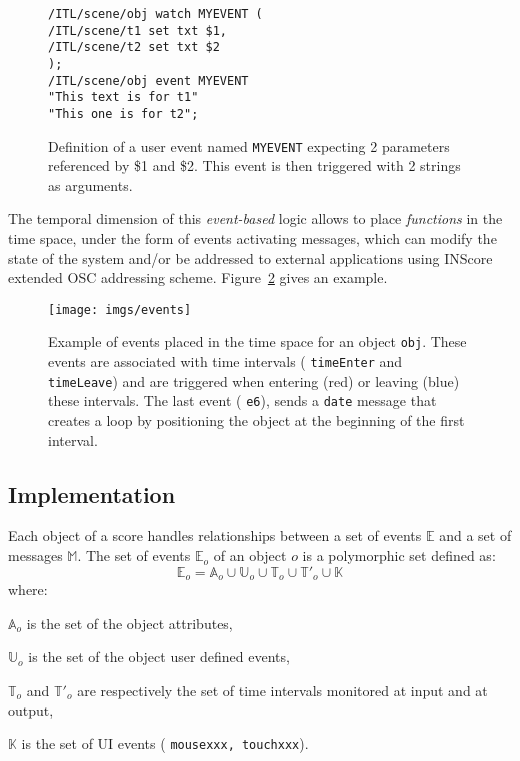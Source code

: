 \documentclass{article}
\newcommand{\OSC}[1]	{{\fontsize{8.5pt}{8pt} \selectfont\texttt{#1}}}
\newcommand{\tab}{\hspace*{4mm}}
\let\olditemize\itemize
\let\oldenditemize\enditemize
\renewenvironment{itemize} 	{\olditemize \renewcommand{\labelitemi}{$\bullet$} \setlength{\itemsep}{0mm}}{\oldenditemize}
\newcommand{\sample}[1]		{\vspace{-0.2em}\begin{center}\colorbox{mygrey}{\begin{minipage}[t]{0.98\columnwidth} {\small \texttt{#1}}\end{minipage}}\end{center}}
\begin{document}
\begin{figure}[h]
   \centering
   \sample{/ITL/scene/obj watch MYEVENT ( \\
\tab/ITL/scene/t1 set txt \$1, \\
\tab/ITL/scene/t2 set txt \$2 \\
);   \\   
/ITL/scene/obj event MYEVENT \\
\hspace*{25mm}"This text is for t1"\\
\hspace*{25mm}"This one is for t2"; 
}
   \caption{Definition of a user event named \OSC{MYEVENT} expecting 2 parameters referenced by \$1 and \$2. This event is then triggered with 2 strings as arguments.}
   \label{fig:uevent}
\end{figure}

The temporal dimension of this \emph{event-based} logic allows to place \emph{functions} in the time space, under the form of events 
activating messages, which can modify the state of the system and/or be addressed to external applications using INScore extended OSC addressing scheme. Figure~\ref{fig:events} gives an example. %
  
\begin{figure}[h]
   \centering
   \texttt{[image: imgs/events]}
   \caption{Example of events placed in the time space for an object \OSC{obj}. These events are associated with time intervals (\OSC{timeEnter} and \OSC{timeLeave}) and are triggered when entering (red) or leaving (blue) these intervals. The last event (\OSC{e6}), sends a \OSC{date} message that creates a loop by positioning the object at the beginning of the first interval.}
   \label{fig:events}
\end{figure}


\subsection{Implementation}

Each object of a score handles relationships between a set of events $\mathbb{E}$ and a set of messages $\mathbb{M}$. The set of events $\mathbb{E}_o$ of an object $o$ is a polymorphic set defined as:
\[
	\mathbb{E}_o = \mathbb{A}_o \cup \mathbb{U}_o \cup \mathbb{T}_o \cup \mathbb{T'}_o \cup \mathbb{K}  
\] 
where:
\begin{itemize}
\item[-] $\mathbb{A}_o$ is the set of the object attributes, 
\item[-] $\mathbb{U}_o$ is the set of the object user defined events, 
\item[-] $\mathbb{T}_o$ and $\mathbb{T'}_o$ are respectively the set of time intervals monitored at input and at output,
\item[-] $\mathbb{K}$ is the set of UI events (\OSC{mousexxx, touchxxx}).
\end{itemize}
\end{document}
